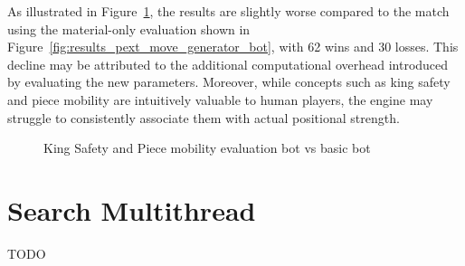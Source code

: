 \noindent As illustrated in Figure~\ref{fig:results_safety_mobility_bot}, the results are slightly worse compared to the match using the material-only evaluation shown in Figure~\ref{fig:results_pext_move_generator_bot}, with 62 wins and 30 losses. This decline may be attributed to the additional computational overhead introduced by evaluating the new parameters. Moreover, while concepts such as king safety and piece mobility are intuitively valuable to human players, the engine may struggle to consistently associate them with actual positional strength.

\begin{center}
    \begin{figure}[H]
        \centering
        \caption{King Safety and Piece mobility evaluation bot vs basic bot}
        \label{fig:results_safety_mobility_bot}
    \end{figure}
\medskip
\end{center}

\section{Search Multithread}
TODO
%
%
%
%

